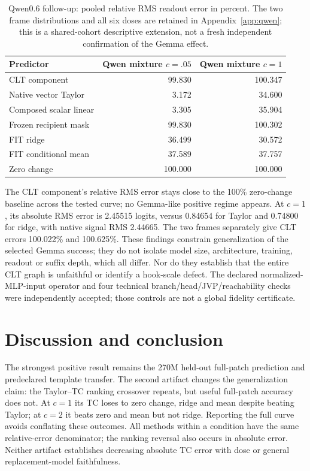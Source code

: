 \begin{table}[ht]
\centering\small
\begin{tabular}{lrr}
\toprule Predictor & Qwen mixture $c=.05$ & Qwen mixture $c=1$\\\midrule
CLT component &99.830&100.347\\
Native vector Taylor &3.172&34.600\\
Composed scalar linear &3.305&35.904\\
Frozen recipient mask &99.830&100.302\\
FIT ridge &36.499&30.572\\
FIT conditional mean &37.589&37.757\\
Zero change &100.000&100.000\\\bottomrule
\end{tabular}
\caption{Qwen0.6 follow-up: pooled relative RMS readout error in percent. The two frame distributions and all six doses are retained in Appendix~\ref{app:qwen}; this is a shared-cohort descriptive extension, not a fresh independent confirmation of the Gemma effect.}\label{tab:qwen}
\end{table}

The CLT component's relative RMS error stays close to the 100\% zero-change baseline across the tested curve; no Gemma-like positive regime appears. At $c=1$, its absolute RMS error is 2.45515 logits, versus 0.84654 for Taylor and 0.74800 for ridge, with native signal RMS 2.44665. The two frames separately give CLT errors 100.022\% and 100.625\%. These findings constrain generalization of the selected Gemma success; they do not isolate model size, architecture, training, readout or suffix depth, which all differ. Nor do they establish that the entire CLT graph is unfaithful or identify a hook-scale defect. The declared normalized-MLP-input operator and four technical branch/head/JVP/reachability checks were independently accepted; those controls are not a global fidelity certificate.

\section{Discussion and conclusion}
The strongest positive result remains the 270M held-out full-patch prediction and predeclared template transfer. The second artifact changes the generalization claim: the Taylor--TC ranking crossover repeats, but useful full-patch accuracy does not. At $c=1$ its TC loses to zero change, ridge and mean despite beating Taylor; at $c=2$ it beats zero and mean but not ridge. Reporting the full curve avoids conflating these outcomes. All methods within a condition have the same relative-error denominator; the ranking reversal also occurs in absolute error. Neither artifact establishes decreasing absolute TC error with dose or general replacement-model faithfulness.

